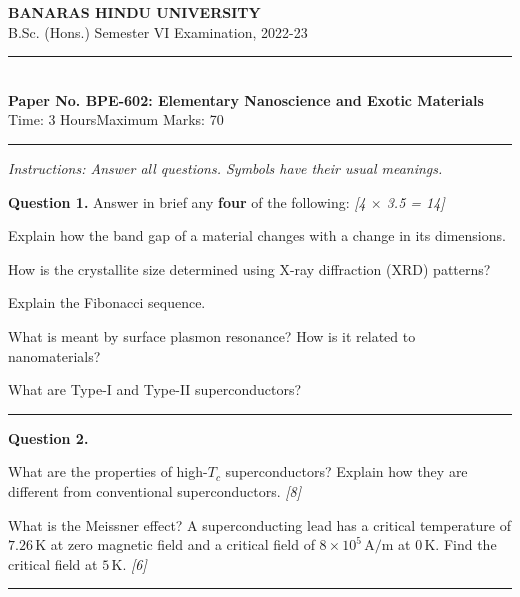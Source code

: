 \documentclass[11pt,a4paper]{article}
\newcommand{\pts}[1]{\hfill   \textit{[#1]}}
\begin{document}
\begin{center}
  {\large\bfseries BANARAS HINDU UNIVERSITY}\\[2pt]
  {\normalsize B.Sc. (Hons.) Semester VI Examination, 2022-23}\\[6pt]
  \rule{0.8\linewidth}{0.5pt}\\[6pt]
  {\large\bfseries Paper No. BPE-602: Elementary Nanoscience and Exotic Materials}\\[4pt]
  {\normalsize Time: 3 Hours\hfill Maximum Marks: 70}
\end{center}
\rule{\linewidth}{0.4pt}
\smallskip



\noindent   \textit{Instructions: Answer all questions. Symbols have their usual meanings.}
\bigskip




\noindent   \textbf{Question 1.} Answer in brief any   \textbf{four} of the following: \pts{4 $ \times$ 3.5 = 14}

\begin{parts}
  \item Explain how the band gap of a material changes with a change in its dimensions.
  \item How is the crystallite size determined using X-ray diffraction (XRD) patterns?
  \item Explain the Fibonacci sequence.
  \item What is meant by surface plasmon resonance? How is it related to nanomaterials?
  \item What are Type-I and Type-II superconductors?
\end{parts}

\medskip\rule{\linewidth}{0.2pt}




\noindent   \textbf{Question 2.}

\begin{parts}
  \item What are the properties of high-$T_c$ superconductors? Explain how they are different from conventional superconductors. \pts{8}
  \item What is the Meissner effect? A superconducting lead has a critical temperature of $7.26\, \text{K}$ at zero magnetic field and a critical field of $8  \times 10^5\, \text{A/m}$ at $0\, \text{K}$. Find the critical field at $5\, \text{K}$. \pts{6}
\end{parts}

\medskip\rule{\linewidth}{0.2pt}
\end{document}
